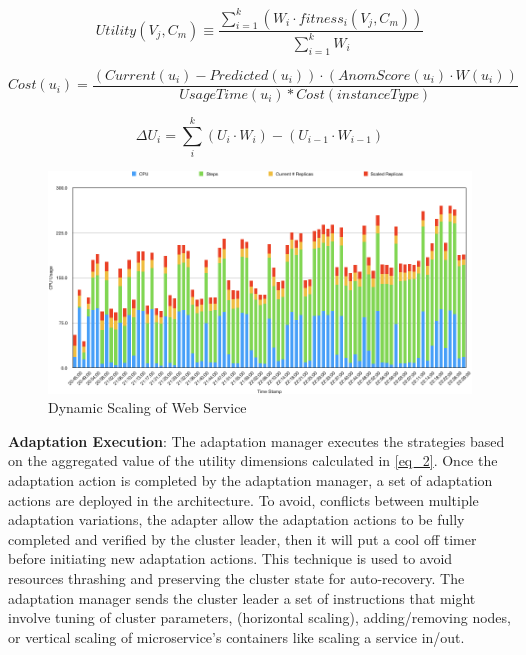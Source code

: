 \documentclass[sigconf]{acmart}
\begin{document}
\begin{equation}
\label{eq_2}
    Utility(V_{j},C_{m}) \equiv \frac{ \sum_{i=1}^{k} (W_{i} \cdot fitness_{i}(V_{j},C_{m}) ) }{\sum_{i=1}^{k} W_{i}}
\end{equation}
 
\begin{equation}
\label{eq_3}
Cost(u_{i}) = \frac{(Current(u_{i}) - Predicted(u_{i}))\cdot (AnomScore(u_{i}) \cdot W(u_{i}))}{UsageTime(u_{i}) * Cost(instanceType)}
\end{equation}


 \begin{equation}
\label{eq_4}
\Delta U_{i}=\sum_{i}^{k} (U_{i}\cdot W_{i})-(U_{i-1}\cdot W_{i-1})
\end{equation}

\begin{figure}[ht!]   
\includegraphics[scale=0.3]{ScalingService}
\caption{ Dynamic Scaling of Web Service}
\label{fig_Scale}
\end{figure} 


\textbf{Adaptation Execution}: The adaptation manager executes the strategies based on the aggregated value of the utility dimensions calculated in \ref{eq_2}. Once the adaptation action is completed by the adaptation manager, a set of adaptation actions are deployed in the architecture. To avoid, conflicts between multiple adaptation variations, the adapter allow the adaptation actions to be fully completed and verified by the cluster leader, then it will put a cool off timer before initiating new adaptation actions. This technique is used to avoid resources thrashing and preserving the cluster state for auto-recovery. The adaptation manager sends the cluster leader a set of instructions that might involve tuning of cluster parameters, (horizontal scaling), adding/removing nodes, or vertical scaling of microservice's containers like scaling a service in/out.  
\end{document}
